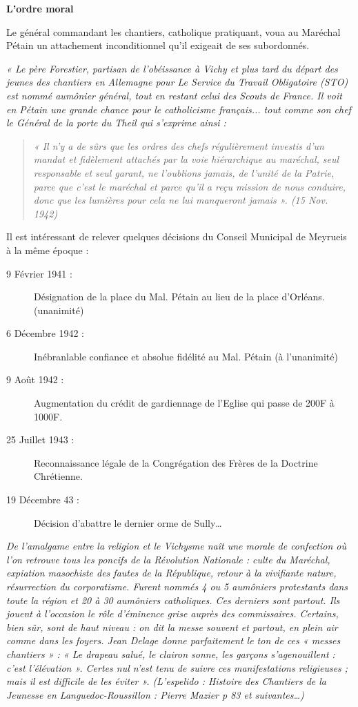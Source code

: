 
\textbf{\Large L’ordre moral}

Le général commandant les chantiers, catholique pratiquant, voua au Maréchal
Pétain un attachement inconditionnel qu’il exigeait de ses subordonnés.

\emph{« Le père Forestier, partisan de l’obéissance à Vichy et plus tard du départ des
jeunes des chantiers en Allemagne pour Le Service du Travail Obligatoire (STO) est
nommé aumônier général, tout en restant celui des Scouts de France. Il voit en
Pétain une grande chance pour le catholicisme français... tout comme son chef le
Général de la porte du Theil qui s’exprime ainsi :}

\begin{quote}
\emph{« Il n’y a de sûrs que les ordres des chefs régulièrement investis d’un mandat et fidèlement attachés
par la voie hiérarchique au maréchal, seul responsable et seul garant, ne l’oublions jamais, de l’unité
de la Patrie, parce que c’est le maréchal et parce qu’il a reçu mission de nous conduire, donc que les
lumières pour cela ne lui manqueront jamais ». (15 Nov. 1942)}
\end{quote}

Il est intéressant de relever quelques décisions du Conseil Municipal de Meyrueis à la même époque :

\begin{description}
\item[9 Février 1941 :] Désignation de la place du Mal. Pétain au lieu de la place d’Orléans. (unanimité)
\item[6 Décembre 1942 :] Inébranlable confiance et absolue fidélité au Mal. Pétain (à l’unanimité)
\item[9 Août 1942 :] Augmentation du crédit de gardiennage de l’Eglise qui passe de 200F à 1000F.
\item[25 Juillet 1943 :] Reconnaissance légale de la Congrégation des Frères de la Doctrine Chrétienne.
\item[19 Décembre 43 :] Décision d’abattre le dernier orme de Sully…
\end{description}

\emph{De l’amalgame entre la religion et le Vichysme naît une morale de confection où
l’on retrouve tous les poncifs de la Révolution Nationale : culte du Maréchal,
expiation masochiste des fautes de la République, retour à la vivifiante nature,
résurrection du corporatisme. Furent nommés 4 ou 5 aumôniers protestants dans
toute la région et 20 à 30 aumôniers catholiques. Ces derniers sont partout. Ils
jouent à l’occasion le rôle d’éminence grise auprès des commissaires. Certains, bien
sûr, sont de haut niveau : on dit la messe souvent et partout, en plein air comme
dans les foyers. Jean Delage donne parfaitement le ton de ces « messes chantiers » :
« Le drapeau salué, le clairon sonne, les garçons s’agenouillent : c’est l’élévation ».
Certes nul n’est tenu de suivre ces manifestations religieuses ; mais il est difficile de
les éviter ». (L’espelido : Histoire des Chantiers de la Jeunesse en Languedoc-Roussillon : Pierre
Mazier p 83 et suivantes…)}

